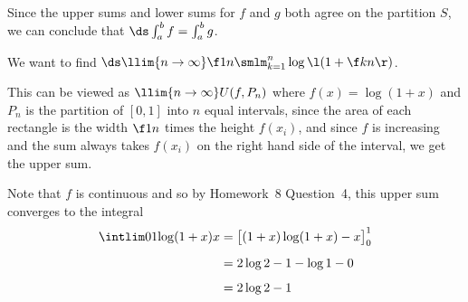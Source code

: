 \documentclass[a4paper]{article}
\begin{document}
Since the upper sums and lower sums for $f$ and $g$ both agree on the partition $S$, we can conclude that $\ds \int_a^b f = \int_a^b g$.



We want to find $\ds \llim{n \to \infty} \f1n \smlm_{k=1}^n \log \l( 1 + \f kn \r)$.

This can be viewed as $\llim{n \to \infty} U(f, P_n)$ where $f(x) = \log(1 + x)$ and $P_n$ is the partition of $[0,1]$ into $n$ equal intervals, since the area of each rectangle is the width $\f1n$ times the height $f(x_i)$, and since $f$ is increasing and the sum always takes $f(x_i)$ on the right hand side of the interval, we get the upper sum.


Note that $f$ is continuous and so by Homework~8 Question~4, this upper sum converges to the integral \begin{align*}
\intlim 01 {\log(1 + x)} x &= \big[ (1+x) \log (1+x) - x \big]_0^1\\[1ex]
&= 2 \log 2 - 1 - \log 1 - 0\\[1ex]
&= 2 \log 2 - 1 %
\end{align*}

\end{document}

